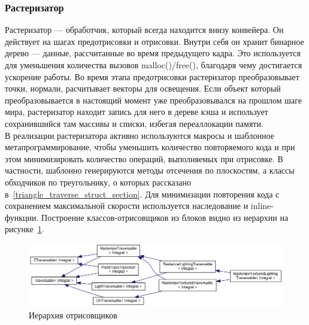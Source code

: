 \documentclass[a4paper,12pt]{report}
\numberwithin{equation}{section}
\begin{document}
\subsubsection{Растеризатор}
Растеризатор --- обработчик, который всегда находится внизу конвейера. Он действует на шагах предотрисовки и отрисовки. Внутри себя он хранит бинарное дерево --- данные, рассчитанные во время предыдущего кадра. Это используется для уменьшения количества вызовов malloc()/free(), благодаря чему достигается ускорение работы. Во время этапа предотрисовки растеризатор преобразовывает точки, нормали, расчитывает векторы для освещения. Если объект который преобразовывается в настоящий момент уже преобразовывался на прошлом шаге мира, растеризатор находит запись для него в дереве кэша и использует сохранившийся там массивы и списки, избегая переаллокации памяти. \\
В реализации растеризатора активно используются макросы и шаблонное метапрограммирование, чтобы уменьшить количество повторяемого кода и при этом минимизировать количество операций, выполняемых при отрисовке. В частности, шаблонно генерируются методы отсечения по плоскостям, а классы обходчиков по треугольнику, о которых рассказано в~\ref{triangle_traverse_struct_section}. Для минимизации повторения кода с сохранением максимальной скорости используется наследование и inline-функции. Построение классов-отрисовщиков из блоков видно из иерархии на рисунке~\ref{rasterizer_hierarchy_img}.

\begin{figure}[!h]
\centering
\includegraphics[width=\textwidth]{inherit_graph_117}
\caption{Иерархия отрисовщиков}
\label{rasterizer_hierarchy_img}
\end{figure}
\end{document}
